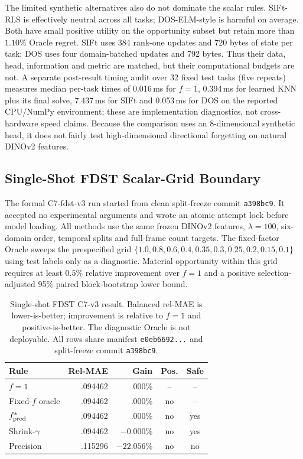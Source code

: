\documentclass[10pt]{article}
\begin{document}
The limited synthetic alternatives also do not dominate the scalar rules.
SIFt-RLS is effectively neutral across all tasks; DOS-ELM-style is harmful on
average. Both have small
positive utility on the opportunity subset but retain more than $1.10\%$
Oracle regret. SIFt uses 384 rank-one updates and 720 bytes of state per task;
DOS uses four domain-batched updates and 792 bytes. Thus their data, head,
information and metric are matched, but their computational budgets are not.
A separate post-result timing audit over 32 fixed test tasks (five repeats)
measures median per-task times of 0.016\,ms for $f=1$, 0.394\,ms for learned
KNN plus its final solve, 7.437\,ms for SIFt and 0.053\,ms for DOS on the
reported CPU/NumPy environment; these are implementation diagnostics, not
cross-hardware speed claims. Because the comparison uses an 8-dimensional
synthetic head, it does not fairly test high-dimensional directional forgetting
on natural DINOv2 features.

\FloatBarrier
\subsection{Single-Shot FDST Scalar-Grid Boundary}

The formal C7-fdst-v3 run started from clean split-freeze commit
\texttt{a398bc9}.  It accepted no experimental arguments and wrote an atomic
attempt lock before model loading.  All methods use the same frozen DINOv2
features, $\lambda=100$, six-domain order, temporal splits and full-frame count
targets.  The fixed-factor Oracle sweeps the prespecified grid
$\{1.0,0.8,0.6,0.4,0.35,0.3,0.25,0.2,0.15,0.1\}$ using test labels only as a
diagnostic. Material opportunity within this grid requires at least $0.5\%$
relative improvement over $f=1$ and a positive selection-adjusted 95\% paired
block-bootstrap lower bound.

\begin{table}[h]
  \centering
  \caption{Single-shot FDST C7-v3 result. Balanced rel-MAE is lower-is-better;
  improvement is relative to $f=1$ and positive-is-better. The diagnostic
  Oracle is not deployable. All rows share manifest
  \texttt{e0eb6692...} and split-freeze commit \texttt{a398bc9}.}
  \label{tab:fdst_c7}
  \setlength{\tabcolsep}{2pt}\footnotesize
  \begin{tabular}{@{}lrrcc@{}}
    \toprule
    Rule & Rel-MAE & Gain & Pos. & Safe \\
    \midrule
    $f=1$ & .094462 & .000\% & -- & -- \\
    Fixed-$f$ oracle & .094462 & .000\% & no & -- \\
    $f^*_{\rm pred}$ & .094462 & .000\% & no & yes \\
    Shrink-$\gamma$ & .094462 & $-0.000$\% & no & yes \\
    Precision & .115296 & $-22.056$\% & no & no \\
    \bottomrule
  \end{tabular}
\end{table}
\end{document}
